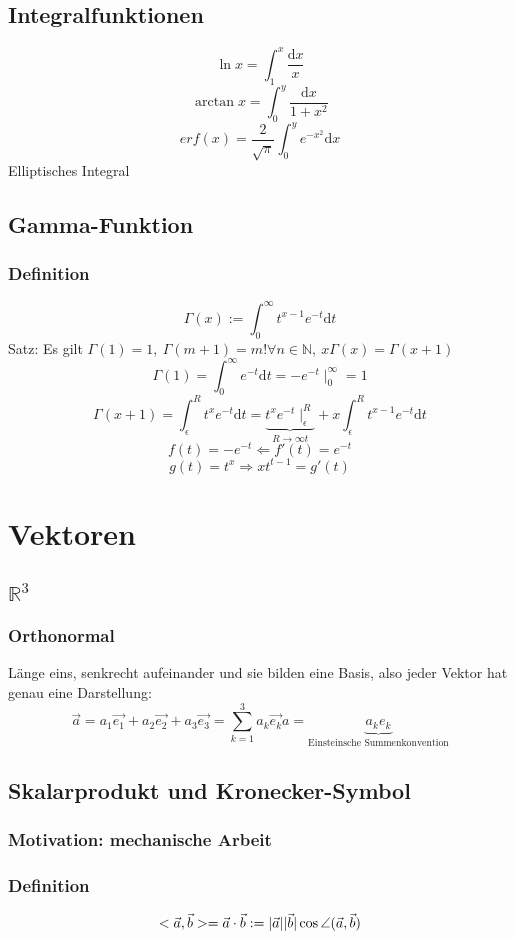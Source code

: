 \documentclass[a4paper]{scrartcl}
\DeclarePairedDelimiter\abs{\lvert}{\rvert}%
\DeclareMathOperator{\Forall}{\forall}
\begin{document}
\subsection{Integralfunktionen}
\label{sec-11-6}
\[\ln{x} = \int_1^x \frac{\mathrm{d}x}{x}\]
\[\arctan{x} = \int_0^y \frac{\mathrm{d}x}{1+x^2}\]
\[erf(x) = \frac{2}{\sqrt{\pi}}\int_0^y e^{-x^2}\mathrm{d}x\]
Elliptisches Integral
\subsection{Gamma-Funktion}
\label{sec-11-7}
\subsubsection{Definition}
\label{sec-11-7-1}
\[\Gamma(x):=\int_0^\infty t^{x-1}e^{-t}\mathrm{d}t\]
Satz: Es gilt $\Gamma(1) = 1,~\Gamma(m+1) = m! \Forall n\in\mathbb{N},~x\Gamma(x) = \Gamma(x+1)$
\[\Gamma(1)=\int_0^\infty e^{-t}\mathrm{d}t=-e^{-t}\mid_0^\infty = 1\]
\[\Gamma(x+1) = \int_\epsilon^R t^x e^{-t}\mathrm{d}t = \underbrace{t^x e^{-t}\mid_\epsilon^R}_{R\to\infty t} + x\int_\epsilon^R t^{x-1}e^{-t}\mathrm{d}t\]
\[f(t) = -e^{-t} \Leftarrow f'(t)=e^{-t}\]
\[g(t) = t^x \Rightarrow xt^{t-1} = g'(t)\]
\section{Vektoren}
\label{sec-12}
\subsection{$\mathbb{R}^3$}
\label{sec-12-1}
\subsubsection{Orthonormal}
\label{sec-12-1-1}
Länge eins, senkrecht aufeinander und sie bilden eine Basis, also jeder Vektor hat genau eine Darstellung: \[\vec{a} = a_1 \vec{e_1} + a_2 \vec{e_2} + a_3 \vec{e_3} = \sum_{k=1}^3 a_k \vec{e_k}a = \underbrace{a_k e_k}_{\text{Einsteinsche Summenkonvention}}\]
\subsection{Skalarprodukt und Kronecker-Symbol}
\label{sec-12-2}
\subsubsection{Motivation: mechanische Arbeit}
\label{sec-12-2-1}
\subsubsection{Definition}
\label{sec-12-2-2}
\[<\vec{a},\vec{b}> = \vec{a}\cdot\vec{b} := \abs{\vec{a}}\abs{\vec{b}}\cos{\angle (\vec{a},\vec{b})}\]
\end{document}
